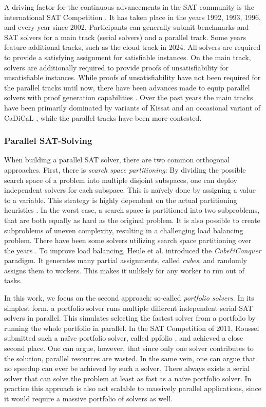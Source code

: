 \documentclass[12pt,a4paper,twoside]{scrartcl}
\numberwithin{equation}{section}
\begin{document}
A driving factor for the continuous advancements in the SAT community is the international SAT Competition \cite{satCompWebsite}. It has taken place in the years 1992, 1993, 1996, and every year since 2002. Participants can generally submit benchmarks and SAT solvers for a main track (serial solvers) and a parallel track. Some years feature additional tracks, such as the cloud track in 2024. All solvers are required to provide a satisfying assignment for satisfiable instances. On the main track, solvers are additionally required to provide proofs of unsatisfiability for unsatisfiable instances. While proofs of unsatisfiability have not been required for the parallel tracks until now, there have been advances made to equip parallel solvers with proof generation capabilities \cite{mallobProofs}.
Over the past years the main tracks have been primarily dominated by variants of Kissat \cite{kissat} and an occasional variant of CaDiCaL \cite{cadical}, while the parallel tracks have been more contested.

\subsubsection{Parallel SAT-Solving}

When building a parallel SAT solver, there are two common orthogonal approaches. First, there is \textit{search space partitioning}: By dividing the possible search space of a problem into multiple disjoint subspaces, one can deploy independent solvers for each subspace. This is na\"ively done by assigning a value to a variable. This strategy is highly dependent on the actual partitioning heuristics \cite{schulz2010cooperate}. In the worst case, a search space is partitioned into two subproblems, that are both equally as hard as the original problem. It is also possible to create subproblems of uneven complexity, resulting in a challenging load balancing problem. There have been some solvers utilizing search space partitioning over the years \cite{jurkowiak2001parallelizing, blochinger2003parallel, feldman2005parallel}. To improve load balancing, Heule et al. \cite{heule2011cube} introduced the \textit{Cube\&Conquer} paradigm. It generates many partial assignments, called \textit{cubes}, and randomly assigns them to workers. This makes it unlikely for any worker to run out of tasks.

In this work, we focus on the second approach: so-called \textit{portfolio solvers}. In its simplest form, a portfolio solver runs multiple different independent serial SAT solvers in parallel. This simulates selecting the fastest solver from a portfolio by running the whole portfolio in parallel. In the SAT Competition of 2011, Roussel submitted such a na\"ive portfolio solver, called ppfolio \cite{ppfolio}, and achieved a close second place. One can argue, however, that since only one solver contributes to the solution, parallel resources are wasted. In the same vein, one can argue that no speedup can ever be achieved by such a solver.  There always exists a serial solver that can solve the problem at least as fast as a na\"ive portfolio solver. In practice this approach is also not scalable to massively parallel applications, since it would require a massive portfolio of solvers as well.
\end{document}
